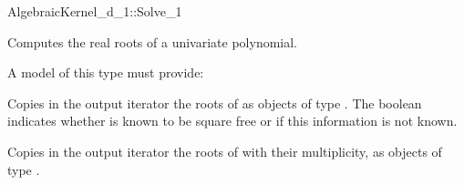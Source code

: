 \begin{ccRefConcept}{AlgebraicKernel_d_1::Solve_1}

\ccDefinition
Computes the real roots of a univariate polynomial.
 
\ccRefines 
{} 


A model of this type must provide:

{Copies in the output iterator the roots of  as objects of type 
. The boolean indicates 
whether  is known to be square free or if this information is 
not known.} 

{Copies in the output iterator the roots of  with their 
multiplicity, as objects of type 
.}

\end{ccRefConcept}

